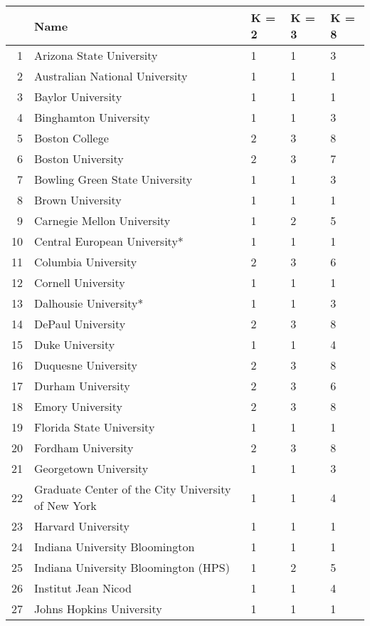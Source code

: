 \begin{table}[ht]
\centering
\begin{tabular}{rllll}
  \hline
 & Name & K = 2 & K = 3 & K = 8 \\ 
  \hline
1 & Arizona State University & 1 & 1 & 3 \\ 
  2 & Australian National University & 1 & 1 & 1 \\ 
  3 & Baylor University & 1 & 1 & 1 \\ 
  4 & Binghamton University & 1 & 1 & 3 \\ 
  5 & Boston College & 2 & 3 & 8 \\ 
  6 & Boston University & 2 & 3 & 7 \\ 
  7 & Bowling Green State University & 1 & 1 & 3 \\ 
  8 & Brown University & 1 & 1 & 1 \\ 
  9 & Carnegie Mellon University & 1 & 2 & 5 \\ 
  10 & Central European University* & 1 & 1 & 1 \\ 
  11 & Columbia University & 2 & 3 & 6 \\ 
  12 & Cornell University & 1 & 1 & 1 \\ 
  13 & Dalhousie University* & 1 & 1 & 3 \\ 
  14 & DePaul University & 2 & 3 & 8 \\ 
  15 & Duke University & 1 & 1 & 4 \\ 
  16 & Duquesne University & 2 & 3 & 8 \\ 
  17 & Durham University & 2 & 3 & 6 \\ 
  18 & Emory University & 2 & 3 & 8 \\ 
  19 & Florida State University & 1 & 1 & 1 \\ 
  20 & Fordham University & 2 & 3 & 8 \\ 
  21 & Georgetown University & 1 & 1 & 3 \\ 
  22 & Graduate Center of the City University of New York & 1 & 1 & 4 \\ 
  23 & Harvard University & 1 & 1 & 1 \\ 
  24 & Indiana University Bloomington & 1 & 1 & 1 \\ 
  25 & Indiana University Bloomington (HPS) & 1 & 2 & 5 \\ 
  26 & Institut Jean Nicod & 1 & 1 & 4 \\ 
  27 & Johns Hopkins University & 1 & 1 & 1 \\ 

\end{tabular}
\end{table}
